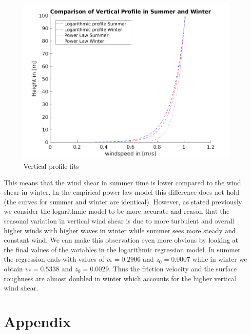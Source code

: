 \documentclass[10pt]{article}
\begin{document}
\begin{figure}[H]
\centering
\includegraphics[width=0.7\linewidth]{../figures/verticalProfilesComparison.png}
\caption{Vertical profile fits}
\label{fig:verticalProfComp}
\end{figure}

This means that the wind shear in summer time is lower compared to the wind shear in winter. In the empirical power law model this difference does not hold (the curves for summer and winter are identical). However, as stated previously we consider the logarithmic model to be more accurate and reason that the seasonal variation in vertical wind shear is due to more turbulent and overall higher winds with higher waves in winter while summer sees more steady and constant wind.
We can make this observation even more obvious by looking at the final values of the variables in the logarithmic regression model. In summer the regression ends with values of $v_{*}=0.2906$ and $z_0=0.0007$ while in winter we obtain $v_{*}=0.5338$ and $z_0=0.0029$. Thus the friction velocity and the surface roughness are almost doubled in winter which accounts for the higher vertical wind shear.

\appendix
\section{Appendix}
\end{document}
